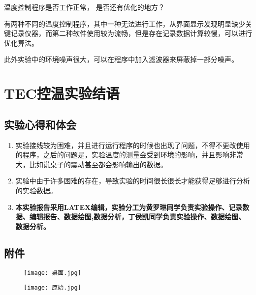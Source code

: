 \documentclass[dvipsnames, svgnames,a4paper,11pt]{article}
\begin{document}
	\begin{question}
		温度控制程序是否工作正常， 是否还有优化的地方？
	\end{question}
	有两种不同的温度控制程序，其中一种无法进行工作，从界面显示发现明显缺少关键记录仪器，而第二种软件使用较为流畅，但是存在记录数据计算较慢，可以进行优化算法。

	此外实验中的环境噪声很大，可以在程序中加入滤波器来屏蔽掉一部分噪声。
	
	
	\clearpage
	
	\section{TEC控温实验\quad\heiti 结语}
	
	\subsection{实验心得和体会}
	\begin{enumerate}
		\item 实验接线较为困难，并且进行运行程序的时候也出现了问题，不得不更改使用的程序，之后的问题是，实验温度的测量会受到环境的影响，并且影响非常大，比如说桌子的震动甚至都会影响输出的数据。
		\item 实验中由于许多困难的存在，导致实验的时间很长很长才能获得足够进行分析的实验数据。
		\item \textbf{本实验报告采用LATEX编辑，实验分工为黄罗琳同学负责实验操作、记录数据、编辑报告、数据绘图,数据分析，丁侯凯同学负责实验操作、数据绘图、数据分析。}
	\end{enumerate}
	
	

	\subsection{附件}
\begin{figure}[{H}]
	\centering
	\texttt{[image: 桌面.jpg]}
	
\end{figure}
	\begin{figure}[{H}]
		\centering
		\texttt{[image: 原始.jpg]}
		
	\end{figure}
	
\end{document}
